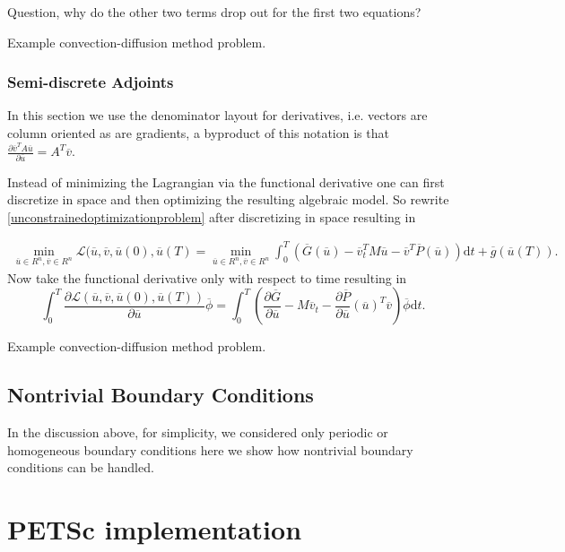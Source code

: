\documentclass[10pt]{article}
\renewcommand{\d}{\mathrm{d}}
\newcommand{\Lagrangian}{{\mathcal{L}}}
\begin{document}
Question, why do the other two terms drop out for the first two equations?

Example convection-diffusion method problem. 

\subsubsection{Semi-discrete Adjoints}

In this section we use the denominator layout for derivatives, i.e. vectors are column oriented as are gradients, a byproduct of this notation is that $ \frac{\partial \overline{v}^T A \overline{u}}{\partial \overline{u}} = A^T \overline{v}.$

Instead of minimizing the Lagrangian via the functional derivative one
can first discretize in space and then optimizing the resulting
algebraic model. So rewrite \ref{unconstrainedoptimizationproblem} after discretizing in space resulting in

\begin{eqnarray}
  \min_{\overline{u} \in R^{n}, \overline{v} \in R^{n}} \Lagrangian(\overline{u},\overline{v},\overline{u}(0),\overline{u}(T) =  \min_{\overline{u} \in R^{n}, \overline{v} \in R^{n}} \int_0^T(\overline{G}(\overline{u})  -   \overline{v}_t^TM\overline{u}  - \overline{v}^T \overline{P}(\overline{u})) \d t + \overline{g}(\overline{u}(T)).
\end{eqnarray}
Now take the functional derivative only with respect to time resulting in
\[
  \int_0^T \frac{\partial \Lagrangian(\overline{u},\overline{v},\overline{u}(0),\overline{u}(T))}{\partial \overline{u}}\overline{\phi} = \int_0^T (\frac{\partial \overline{G}}{\partial \overline{u}} -  M \overline{v}_t  - \frac{\partial \overline{P}}{\partial \overline{u}}(\overline{u})^T\overline{v})\overline{\phi} \d  t.
\]

Example convection-diffusion method problem.


\subsection{Nontrivial Boundary Conditions}

In the discussion above, for simplicity, we considered only periodic or homogeneous boundary conditions here we show how nontrivial boundary conditions can be handled. 

\section{PETSc implementation}
\end{document}
